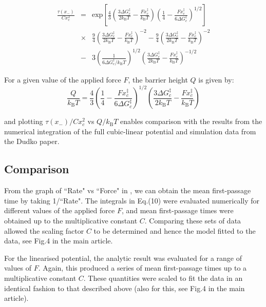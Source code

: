\documentclass[twocolumn,pre,aps,showpacs,a4paper,floatfix,amssymb]{revtex4-1}
\begin{document}
\begin{eqnarray}
\frac{\tau(x_-)}{Cx_c^2} &=& \text{exp}\left[\frac{4}{3}\left(\frac{3\Delta G_c^\ddagger}{2k_\text{B}T} - \frac{Fx_c^\ddagger}{k_\text{B}T}\right)\left(\frac{1}{4} - \frac{Fx_c^\ddagger}{6\Delta G_c^\ddagger}\right)^{1/2}\right] \nonumber \\ &\times& \frac{9}{4}\left(\frac{3\Delta G_c^\ddagger}{2k_\text{B}T} - \frac{Fx_c^\ddagger}{k_\text{B}T}\right)^{-2} - \frac{9}{4}\left(\frac{3\Delta G_c^\ddagger}{2k_\text{B}T} - \frac{Fx_c^\ddagger}{k_\text{B}T}\right)^{-2} \nonumber
\\ &-& 3\left(\frac{1}{6\Delta G_c^\ddagger/k_\text{B}T}\right)^{1/2}\left(\frac{3\Delta G_c^\ddagger}{2k_\text{B}T} - \frac{Fx_c^\ddagger}{k_\text{B}T}\right)^{-1/2}
\end{eqnarray}


\noindent For a given value of the applied force $F$, the barrier height $Q$ is given by:
\begin{equation}
\frac{Q}{k_\text{B}T} = \frac{4}{3}\left(\frac{1}{4} - \frac{Fx_c^\ddagger}{6\Delta G_c^\ddagger}\right)^{1/2}\left(\frac{3\Delta G_c^\ddagger}{2k_\text{B}T} - \frac{Fx_c^\ddagger}{k_\text{B}T}\right)
\end{equation}

\noindent and plotting $\tau(x_-)/Cx_c^2$ vs $Q/k_\text{B}T$ enables comparison with the results from the numerical integration of the full cubic-linear potential and simulation data from the Dudko paper.



\subsection{Comparison}
From the graph of ``Rate" vs ``Force" in \cite{dudko2006intrinsic}, we can obtain the mean first-passage time by taking 1/``Rate". The integrals in Eq.(10) were evaluated numerically for different values of the applied force $F$, and mean first-passage times were obtained up to the multiplicative constant $C$. Comparing these sets of data allowed the scaling factor $C$ to be determined and hence the model fitted to the data, see Fig.4 in the main article.

For the linearised potential, the analytic result was evaluated for a range of values of $F$. Again, this produced a series of mean first-passage times up to a multiplicative constant $C$. These quantities were scaled to fit the data in an identical fashion to that described above (also for this, see Fig.4 in the main article).
\end{document}
